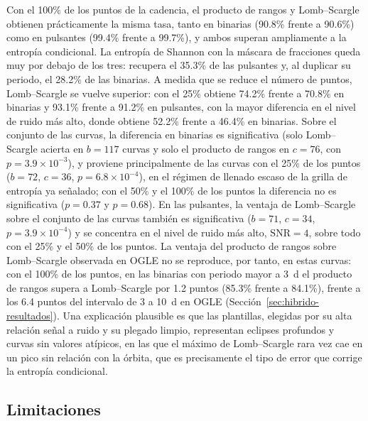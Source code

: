 \documentclass[12pt,letterpaper,oneside]{book}
\begin{document}
Con el 100\% de los puntos de la cadencia, el producto de rangos y Lomb--Scargle obtienen pr\'acticamente la misma tasa, tanto en binarias (90.8\% frente a 90.6\%) como en pulsantes (99.4\% frente a 99.7\%), y ambos superan ampliamente a la entrop\'ia condicional. La entrop\'ia de Shannon con la m\'ascara de fracciones queda muy por debajo de los tres: recupera el 35.3\% de las pulsantes y, al duplicar su periodo, el 28.2\% de las binarias. A medida que se reduce el n\'umero de puntos, Lomb--Scargle se vuelve superior: con el 25\% obtiene 74.2\% frente a 70.8\% en binarias y 93.1\% frente a 91.2\% en pulsantes, con la mayor diferencia en el nivel de ruido m\'as alto, donde obtiene 52.2\% frente a 46.4\% en binarias. Sobre el conjunto de las curvas, la diferencia en binarias es significativa (solo Lomb--Scargle acierta en $b=117$ curvas y solo el producto de rangos en $c=76$, con $p=3.9\times10^{-3}$), y proviene principalmente de las curvas con el 25\% de los puntos ($b=72$, $c=36$, $p=6.8\times10^{-4}$), en el r\'egimen de llenado escaso de la grilla de entrop\'ia ya se\~nalado; con el 50\% y el 100\% de los puntos la diferencia no es significativa ($p=0.37$ y $p=0.68$). En las pulsantes, la ventaja de Lomb--Scargle sobre el conjunto de las curvas tambi\'en es significativa ($b=71$, $c=34$, $p=3.9\times10^{-4}$) y se concentra en el nivel de ruido m\'as alto, $\mathrm{SNR}=4$, sobre todo con el 25\% y el 50\% de los puntos. La ventaja del producto de rangos sobre Lomb--Scargle observada en OGLE no se reproduce, por tanto, en estas curvas: con el 100\% de los puntos, en las binarias con periodo mayor a 3~d el producto de rangos supera a Lomb--Scargle por 1.2 puntos (85.3\% frente a 84.1\%), frente a los 6.4 puntos del intervalo de 3 a 10~d en OGLE (Secci\'on~\ref{sec:hibrido-resultados}). Una explicaci\'on plausible es que las plantillas, elegidas por su alta relaci\'on se\~nal a ruido y su plegado limpio, representan eclipses profundos y curvas sin valores at\'ipicos, en las que el m\'aximo de Lomb--Scargle rara vez cae en un pico sin relaci\'on con la \'orbita, que es precisamente el tipo de error que corrige la entrop\'ia condicional.

\subsection{Limitaciones}
\end{document}
